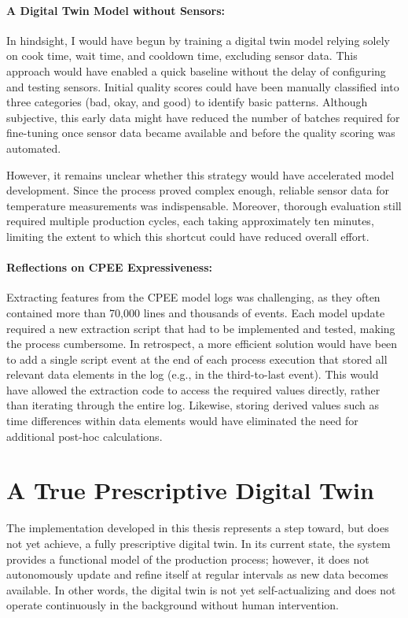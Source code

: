 \paragraph{A Digital Twin Model without Sensors:}
In hindsight, I would have begun by training a digital twin model relying solely on cook time, wait time, and cooldown time, excluding sensor data. This approach would have enabled a quick baseline without the delay of configuring and testing sensors. Initial quality scores could have been manually classified into three categories (bad, okay, and good) to identify basic patterns. Although subjective, this early data might have reduced the number of batches required for fine-tuning once sensor data became available and before the quality scoring was automated. 

However, it remains unclear whether this strategy would have accelerated model development. Since the process proved complex enough, reliable sensor data for temperature measurements was indispensable. Moreover, thorough evaluation still required multiple production cycles, each taking approximately ten minutes, limiting the extent to which this shortcut could have reduced overall effort.


\paragraph{Reflections on CPEE Expressiveness:}
Extracting features from the CPEE model logs was challenging, as they often contained more than 70,000 lines and thousands of events. Each model update required a new extraction script that had to be implemented and tested, making the process cumbersome. In retrospect, a more efficient solution would have been to add a single script event at the end of each process execution that stored all relevant data elements in the log (e.g., in the third-to-last event). This would have allowed the extraction code to access the required values directly, rather than iterating through the entire log. Likewise, storing derived values such as time differences within data elements would have eliminated the need for additional post-hoc calculations.

\section{A True Prescriptive Digital Twin}
The implementation developed in this thesis represents a step toward, but does not yet achieve, a fully prescriptive digital twin. In its current state, the system provides a functional model of the production process; however, it does not autonomously update and refine itself at regular intervals as new data becomes available. In other words, the digital twin is not yet self-actualizing and does not operate continuously in the background without human intervention.

